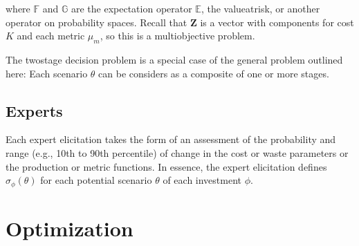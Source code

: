 \documentclass[letterpaper,10pt,english]{sphinxmanual}
\begin{document}
\sphinxAtStartPar
where \(\mathbb{F}\) and \(\mathbb{G}\) are the expectation
operator \(\mathbb{E}\), the value\sphinxhyphen{}at\sphinxhyphen{}risk, or another operator on
probability spaces. Recall that \(\mathbf{Z}\) is a vector with
components for cost \(K\) and each metric \(\mu_m\), so this is
a multi\sphinxhyphen{}objective problem.

\sphinxAtStartPar
The two\sphinxhyphen{}stage decision problem is a special case of the general problem
outlined here: Each scenario \(\theta\) can be considers as a
composite of one or more stages.


\section{Experts}
\label{\detokenize{formulation:experts}}
\sphinxAtStartPar
Each expert elicitation takes the form of an assessment of the
probability and range (e.g., 10th to 90th percentile) of change in the
cost or waste parameters or the production or metric functions. In
essence, the expert elicitation defines \(\sigma_\phi(\theta)\) for
each potential scenario \(\theta\) of each investment \(\phi\).

\sphinxstepscope


\chapter{Optimization}
\label{\detokenize{optimizers:optimization}}\label{\detokenize{optimizers:sec-optimizers}}\label{\detokenize{optimizers::doc}}
\end{document}
